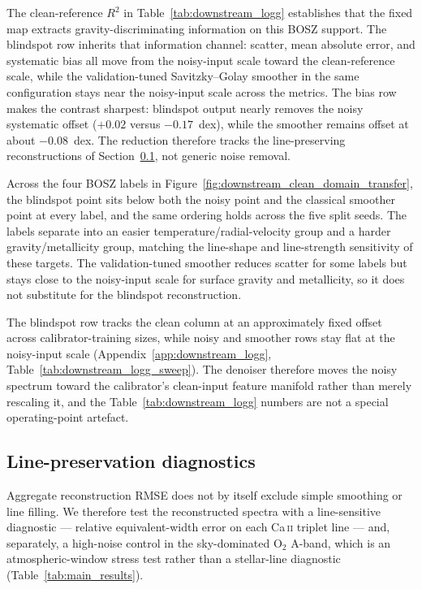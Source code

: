 \documentclass[twocolumn]{aastex7}
\begin{document}
The clean-reference $R^{2}$ in Table~\ref{tab:downstream_logg} establishes that the fixed map extracts gravity-discriminating information on this BOSZ support. The blindspot row inherits that information channel: scatter, mean absolute error, and systematic bias all move from the noisy-input scale toward the clean-reference scale, while the validation-tuned Savitzky--Golay smoother in the same configuration stays near the noisy-input scale across the metrics. The bias row makes the contrast sharpest: blindspot output nearly removes the noisy systematic offset (\mbox{$+0.02$} versus $-0.17$~dex), while the smoother remains offset at about $-0.08$~dex. The reduction therefore tracks the line-preserving reconstructions of Section~\ref{sec:results_physical}, not generic noise removal.

Across the four BOSZ labels in Figure~\ref{fig:downstream_clean_domain_transfer}, the blindspot point sits below both the noisy point and the classical smoother point at every label, and the same ordering holds across the five split seeds. The labels separate into an easier temperature/radial-velocity group and a harder gravity/metallicity group, matching the line-shape and line-strength sensitivity of these targets. The validation-tuned smoother reduces scatter for some labels but stays close to the noisy-input scale for surface gravity and metallicity, so it does not substitute for the blindspot reconstruction.

The blindspot row tracks the clean column at an approximately fixed offset across calibrator-training sizes, while noisy and smoother rows stay flat at the noisy-input scale (Appendix~\ref{app:downstream_logg}, Table~\ref{tab:downstream_logg_sweep}). The denoiser therefore moves the noisy spectrum toward the calibrator's clean-input feature manifold rather than merely rescaling it, and the Table~\ref{tab:downstream_logg} numbers are not a special operating-point artefact.

\subsection{Line-preservation diagnostics}
\label{sec:results_physical}

Aggregate reconstruction RMSE does not by itself exclude simple smoothing or line filling. We therefore test the reconstructed spectra with a line-sensitive diagnostic --- relative equivalent-width error on each Ca\,\textsc{ii} triplet line --- and, separately, a high-noise control in the sky-dominated \mbox{O$_2$} A-band, which is an atmospheric-window stress test rather than a stellar-line diagnostic (Table~\ref{tab:main_results}).
\end{document}

